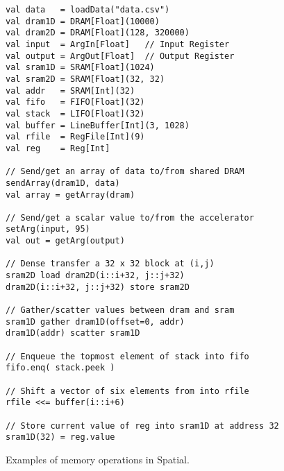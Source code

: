 \begin{figure}
\centering\hspace{40pt}\begin{lstlisting}[language=SpatialTable]
val data   = loadData("data.csv")
val dram1D = DRAM[Float](10000)
val dram2D = DRAM[Float](128, 320000)
val input  = ArgIn[Float]   // Input Register
val output = ArgOut[Float]  // Output Register
val sram1D = SRAM[Float](1024)
val sram2D = SRAM[Float](32, 32)
val addr   = SRAM[Int](32)
val fifo   = FIFO[Float](32)
val stack  = LIFO[Float](32)
val buffer = LineBuffer[Int](3, 1028)
val rfile  = RegFile[Int](9)
val reg    = Reg[Int]

// Send/get an array of data to/from shared DRAM
sendArray(dram1D, data)
val array = getArray(dram)

// Send/get a scalar value to/from the accelerator
setArg(input, 95)
val out = getArg(output)

// Dense transfer a 32 x 32 block at (i,j)
sram2D load dram2D(i::i+32, j::j+32)
dram2D(i::i+32, j::j+32) store sram2D

// Gather/scatter values between dram and sram
sram1D gather dram1D(offset=0, addr)
dram1D(addr) scatter sram1D

// Enqueue the topmost element of stack into fifo
fifo.enq( stack.peek )

// Shift a vector of six elements from into rfile
rfile <<= buffer(i::i+6)

// Store current value of reg into sram1D at address 32
sram1D(32) = reg.value
\end{lstlisting}
\caption{Examples of memory operations in Spatial.}
\label{f:memexamples}
\end{figure}
